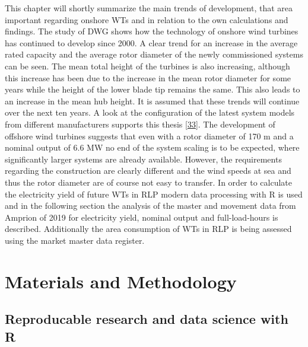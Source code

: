 \documentclass[a4paper,11pt]{article}
\begin{document}
This chapter will shortly summarize the main trends of development, that area important regarding onshore WTs and in relation to the own calculations and findings. The study of DWG shows how the technology of onshore wind turbines has continued to develop since 2000. A clear trend for an increase in the average rated capacity and the average rotor diameter of the newly commissioned systems can be seen. The mean total height of the turbines is also increasing, although this increase has been due to the increase in the mean rotor diameter for some years while the height of the lower blade tip remains the same. This also leads to an increase in the mean hub height. It is assumed that these trends will continue over the next ten years. A look at the configuration of the latest system models from different manufacturers supports this thesis {[}\protect\hyperlink{ref-VestasWindSystemsAS.2019}{33}{]}. The development of offshore wind turbines suggests that even with a rotor diameter of 170 m and a nominal output of 6.6 MW no end of the system scaling is to be expected, where significantly larger systems are already available. However, the requirements regarding the construction are clearly different and the wind speeds at sea and thus the rotor diameter are of course not easy to transfer. In order to calculate the electricity yield of future WTs in RLP modern data processing with R is used and in the following section the analysis of the master and movement data from Amprion of 2019 for electricity yield, nominal output and full-load-hours is described. Additionally the area consumption of WTs in RLP is being assessed using the market master data register.

\newpage

\hypertarget{materials-and-methodology}{%
\section{Materials and Methodology}\label{materials-and-methodology}}

\hypertarget{reproducable-research-and-data-science-with-r}{%
\subsection{Reproducable research and data science with R}\label{reproducable-research-and-data-science-with-r}}
\end{document}
